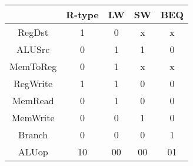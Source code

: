 \begin{tabular}[t]{ccccc}
    \toprule
             & R-type      & LW          & SW          & BEQ         \\
    \midrule
    RegDst   & {1}  & {0}  & {x}  & {x}  \\
    ALUSrc   & {0}  & {1}  & {1}  & {0}  \\
    MemToReg & {0}  & {1}  & {x}  & {x}  \\
    RegWrite & {1}  & {1}  & {0}  & {0}  \\
    MemRead  & {0}  & {1}  & {0}  & {0}  \\
    MemWrite & {0}  & {0}  & {1}  & {0}  \\
    Branch   & {0}  & {0}  & {0}  & {1}  \\
    ALUop    & {10} & {00} & {00} & {01} \\
    \bottomrule
\end{tabular}
